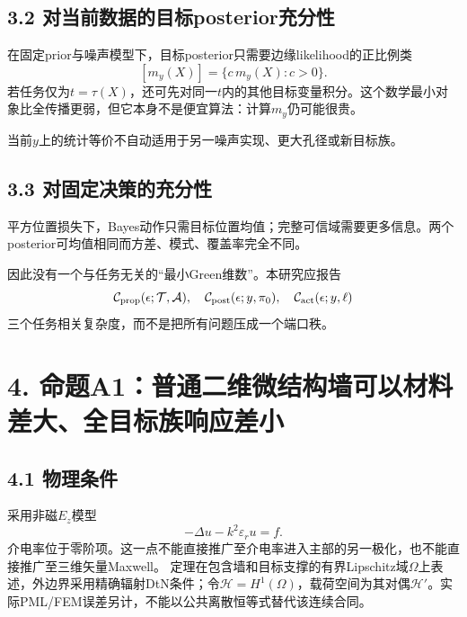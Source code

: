 \documentclass[
  10pt,
  a4paper,
]{article}
\begin{document}
\hypertarget{ux5bf9ux5f53ux524dux6570ux636eux7684ux76eeux6807posteriorux5145ux5206ux6027}{%
\subsection{3.2
对当前数据的目标posterior充分性}\label{ux5bf9ux5f53ux524dux6570ux636eux7684ux76eeux6807posteriorux5145ux5206ux6027}}

在固定prior与噪声模型下，目标posterior只需要边缘likelihood的正比例类 \[
[m_y(X)]=\{c\,m_y(X):c>0\}.
\]
若任务仅为\(t=\tau(X)\)，还可先对同一\(t\)内的其他目标变量积分。这个数学最小对象比全传播更弱，但它本身不是便宜算法：计算\(m_y\)仍可能很贵。

当前\(y\)上的统计等价不自动适用于另一噪声实现、更大孔径或新目标族。

\hypertarget{ux5bf9ux56faux5b9aux51b3ux7b56ux7684ux5145ux5206ux6027}{%
\subsection{3.3
对固定决策的充分性}\label{ux5bf9ux56faux5b9aux51b3ux7b56ux7684ux5145ux5206ux6027}}

平方位置损失下，Bayes动作只需目标位置均值；完整可信域需要更多信息。两个posterior可均值相同而方差、模式、覆盖率完全不同。

因此没有一个与任务无关的``最小Green维数''。本研究应报告 \[
\mathcal C_{\rm prop}(\epsilon;\mathcal T,\mathcal A),\quad
\mathcal C_{\rm post}(\epsilon;y,\pi_0),\quad
\mathcal C_{\rm act}(\epsilon;y,\ell)
\] 三个任务相关复杂度，而不是把所有问题压成一个端口秩。

\hypertarget{ux547dux9898a1ux666eux901aux4e8cux7ef4ux5faeux7ed3ux6784ux5899ux53efux4ee5ux6750ux6599ux5deeux5927ux5168ux76eeux6807ux65cfux54cdux5e94ux5deeux5c0f}{%
\section{4.
命题A1：普通二维微结构墙可以材料差大、全目标族响应差小}\label{ux547dux9898a1ux666eux901aux4e8cux7ef4ux5faeux7ed3ux6784ux5899ux53efux4ee5ux6750ux6599ux5deeux5927ux5168ux76eeux6807ux65cfux54cdux5e94ux5deeux5c0f}}

\hypertarget{ux7269ux7406ux6761ux4ef6}{%
\subsection{4.1 物理条件}\label{ux7269ux7406ux6761ux4ef6}}

采用非磁\(E_z\)模型 \[
-\Delta u-k^2\varepsilon_r u=f.
\]
介电率位于零阶项。这一点不能直接推广至介电率进入主部的另一极化，也不能直接推广至三维矢量Maxwell。
定理在包含墙和目标支撑的有界Lipschitz域\(\Omega\)上表述，外边界采用精确辐射DtN条件；令\(\mathcal H=H^1(\Omega)\)，载荷空间为其对偶\(\mathcal H\prime\)。实际PML/FEM误差另计，不能以公共离散恒等式替代该连续合同。
\end{document}
